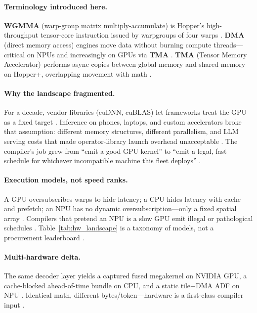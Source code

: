 \paragraph{Terminology introduced here.}
\textbf{WGMMA} (warp-group matrix multiply-accumulate) is Hopper's high-throughput tensor-core instruction issued by warpgroups of four warps \citep{shah2024flashattention3,nvidia2022hopper}.
\textbf{DMA} (direct memory access) engines move data without burning compute threads---critical on NPUs and increasingly on GPUs via \textbf{TMA} \citep{semianalysis2024tma,amd2024xdna}.
\textbf{TMA} (Tensor Memory Accelerator) performs async copies between global memory and shared memory on Hopper+, overlapping movement with math \citep{nvidia2022hopper,semianalysis2024tma}.

\paragraph{Why the landscape fragmented.}
For a decade, vendor libraries (cuDNN, cuBLAS) let frameworks treat the GPU as a fixed target \citep{chen2018tvm,chen2020compilerbasedhardw}.
Inference on phones, laptops, and custom accelerators broke that assumption: different memory structures, different parallelism, and LLM serving costs that made operator-library launch overhead unacceptable \citep{taxbreak2026,kwon2023vllm}.
The compiler's job grew from ``emit a good GPU kernel'' to ``emit a legal, fast schedule for whichever incompatible machine this fleet deploys'' \citep{yirage2026,patel2025llminference}.

\paragraph{Execution models, not speed ranks.}
A GPU oversubscribes warps to hide latency; a CPU hides latency with cache and prefetch; an NPU has no dynamic oversubscription---only a fixed spatial array \citep{nvidia2022hopper,dlbook,amd2024xdna}.
Compilers that pretend an NPU is a slow GPU emit illegal or pathological schedules \citep{wu2024mirage,amd2024aie}.
Table~\ref{tab:hw_landscape} is a taxonomy of models, not a procurement leaderboard \citep{memoryfloor2026}.

\paragraph{Multi-hardware delta.}
The same decoder layer yields a captured fused megakernel on NVIDIA GPU, a cache-blocked ahead-of-time bundle on CPU, and a static tile+DMA ADF on NPU \citep{semianalysis2024tma,amd2024aie,rotem2018glow}.
Identical math, different bytes/token---hardware is a first-class compiler input \citep{yirage2026,chen2020compilerbasedhardw}.


